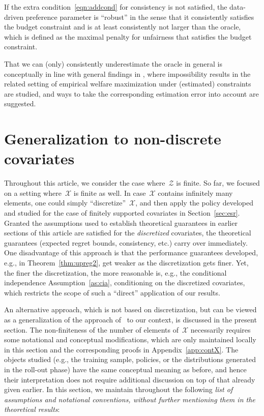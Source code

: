 \documentclass[11pt, a4paper]{article}
\theoremstyle{definition}
\begin{document}
If the extra condition~\eqref{eqn:addcond} for consistency is not satisfied, the data-driven preference parameter is ``robust'' in the sense that it consistently satisfies the budget constraint and is at least consistently not larger than the oracle, which is defined as the maximal penalty for unfairness that satisfies the budget constraint. 

That we can (only) consistently underestimate the oracle in general is conceptually in line with general findings in \cite{lsun}, where impossibility results in the related setting of empirical welfare maximization under (estimated) constraints are studied, and ways to take the corresponding estimation error into account are suggested.

\section{Generalization to non-discrete covariates}\label{sec:contX}

Throughout this article, we consider the case where~$\mathcal{Z}$ is finite. So far, we focused on a setting where~$\mathcal{X}$ is finite as well. In case~$\mathcal{X}$ contains infinitely many elements, one could simply ``discretize''~$\mathcal{X}$, and then apply the policy developed and studied for the case of finitely supported covariates in Section~\ref{sec:esr}. Granted the assumptions used to establish theoretical guarantees in earlier sections of this article are satisfied for the \emph{discretized} covariates, the theoretical guarantees (expected regret bounds, consistency, etc.) carry over immediately. One disadvantage of this approach is that the performance guarantees developed, e.g., in Theorem~\ref{thm:upreg2}, get weaker as the discretization gets finer. Yet, the finer the discretization, the more reasonable is, e.g., the conditional independence Assumption~\ref{as:cia}, conditioning on the discretized covariates, which restricts the scope of such a ``direct'' application of our results.

An alternative approach, which is not based on discretization, but can be viewed as a generalization of the approach of~\cite{kitagawa2019equality} to our context, is discussed in the present section. The non-finiteness of the number of elements of~$\mathcal{X}$ necessarily requires some notational and conceptual modifications, which are only maintained locally in this section and the corresponding proofs in Appendix~\ref{app:contX}. The objects studied (e.g., the training sample, policies, or the distributions generated in the roll-out phase) have the same conceptual meaning as before, and hence their interpretation does not require additional discussion on top of that already given earlier. In this section, we maintain throughout the following \emph{list of assumptions and notational conventions, without further mentioning them in the theoretical results}:
\end{document}
